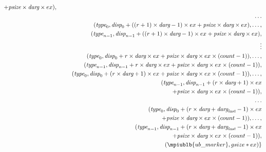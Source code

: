 \begin{eqnarray*}
                + \mword{psize} \times \mword{darg} \times ex), \\
& & \ldots \\
& &  (\mword{type}_0, \mword{disp}_0 + ((r+1) \times \mword{darg} -1) \times ex
                 + \mword{psize} \times \mword{darg} \times ex), \ldots , \\
& & \hspace{.5in} (\mword{type}_{n-1}, \mword{disp}_{n-1} + ((r+1) \times \mword{darg} - 1)\times ex
                 + \mword{psize} \times \mword{darg} \times ex), \\
& & \hspace{.5in}\vdots \\
& &  (\mword{type}_0, \mword{disp}_0 + r \times \mword{darg} \times ex + \mword{psize} \times \mword{darg} \times ex
                \times (count - 1)),
        \ldots , \\
& & \hspace{.5in} (\mword{type}_{n-1}, \mword{disp}_{n-1} + r \times \mword{darg} \times ex
                + \mword{psize} \times \mword{darg} \times ex \times (count - 1)), \\
& &  (\mword{type}_0, \mword{disp}_0 + (r \times \mword{darg} + 1) \times ex
         + \mword{psize} \times \mword{darg} \times ex \times (count - 1)),
        \ldots , \\
& & \hspace{.5in} (\mword{type}_{n-1}, \mword{disp}_{n-1} + (r \times \mword{darg} + 1) \times ex \\
& & \hspace{1in} + \mword{psize} \times \mword{darg} \times ex \times (count - 1)), \\
& & \ldots \\
& &  (\mword{type}_0, \mword{disp}_0 + (r \times \mword{darg} + \mword{darg}_{\msword{last}}-1) \times ex \\
& & \hspace{1in} + \mword{psize} \times \mword{darg} \times ex \times (count-1)),
        \ldots , \\
& & \hspace{.5in} (\mword{type}_{n-1}, \mword{disp}_{n-1} + (r \times \mword{darg} + \mword{darg}_{\msword{last}} - 1)
                \times ex \\
& & \hspace{1in} + \mword{psize} \times \mword{darg} \times ex \times (count - 1)), \\
& &   (\mpiublb{ub\_marker}, gsize * ex) \}
\end{eqnarray*}

